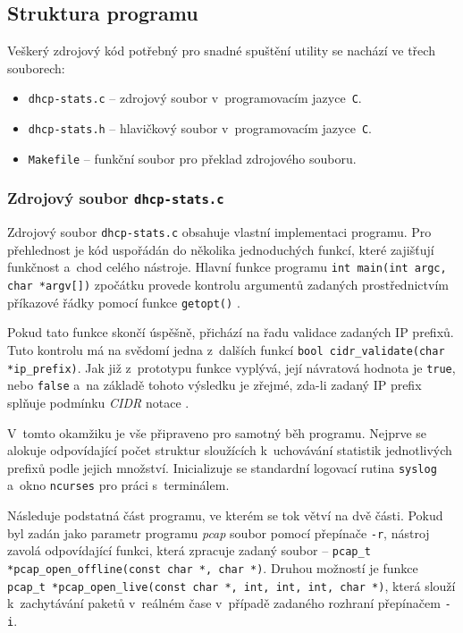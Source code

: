 \documentclass[a4paper, 11pt]{article}
\begin{document}
\subsection{Struktura programu}
Veškerý zdrojový kód potřebný pro snadné spuštění utility se nachází ve třech souborech:
\begin{itemize}
    \item \texttt{dhcp-stats.c} -- zdrojový soubor v~programovacím jazyce~\texttt{C}.
    \item \texttt{dhcp-stats.h} -- hlavičkový soubor v~programovacím jazyce~\texttt{C}.
    \item \texttt{Makefile} -- funkční soubor pro překlad zdrojového souboru.
\end{itemize}

\subsubsection{Zdrojový soubor \texttt{dhcp-stats.c}}
Zdrojový soubor \texttt{dhcp-stats.c} obsahuje vlastní implementaci programu.
Pro přehlednost je kód uspořádán do několika jednoduchých funkcí, které zajišťují funkčnost a~chod celého nástroje.
Hlavní funkce programu \texttt{int main(int argc, char *argv[])} zpočátku provede kontrolu argumentů zadaných prostřednictvím příkazové řádky pomocí funkce \texttt{getopt()} \cite{getopt}.

Pokud tato funkce skončí úspěšně, přichází na řadu validace zadaných IP prefixů.
Tuto kontrolu má na svědomí jedna z~dalších funkcí \texttt{bool cidr\_validate(char *ip\_prefix)}.
Jak již z~prototypu funkce vyplývá, její návratová hodnota je \texttt{true}, nebo \texttt{false} a~na základě tohoto výsledku je zřejmé, zda-li zadaný IP prefix splňuje podmínku \textit{CIDR} notace \cite{cidr}.

V~tomto okamžiku je vše připraveno pro samotný běh programu.
Nejprve se alokuje odpovídající počet struktur sloužících k~uchovávání statistik jednotlivých prefixů podle jejich množství.
Inicializuje se standardní logovací rutina \texttt{syslog} \cite{syslog} a~okno \texttt{ncurses} \cite{ncurses} pro práci s~terminálem.

Následuje podstatná část programu, ve kterém se tok větví na dvě části.
Pokud byl zadán jako parametr programu \textit{pcap} soubor pomocí přepínače \texttt{-r}, nástroj zavolá odpovídající funkci, která zpracuje zadaný soubor -- \texttt{pcap\_t *pcap\_open\_offline(const char *, char *)}.
Druhou možností je funkce \texttt{pcap\_t *pcap\_open\_live(const char *, int, int, int, char *)}, která slouží k~zachytávání paketů v~reálném čase v~případě zadaného rozhraní přepínačem \texttt{-i}.
\end{document}
